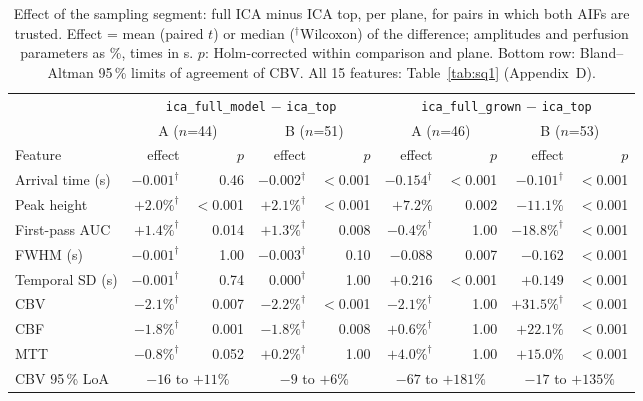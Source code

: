 \begin{table}[t]
\centering
\caption{Effect of the sampling segment: full ICA minus ICA top, per plane, for pairs in which both AIFs are
trusted. Effect = mean (paired $t$) or median ($^\dagger$Wilcoxon) of the difference; amplitudes and perfusion
parameters as \%, times in s. $p$: Holm-corrected within comparison and plane. Bottom row: Bland--Altman 95\,\%
limits of agreement of CBV. All 15 features: Table~\ref{tab:sq1} (Appendix~D).}
\label{tab:sq1_main}
\footnotesize
\begin{tabular}{l rr rr rr rr}
\hline
 & \multicolumn{4}{c}{\texttt{ica\_full\_model} $-$ \texttt{ica\_top}} & \multicolumn{4}{c}{\texttt{ica\_full\_grown} $-$ \texttt{ica\_top}} \\
 & \multicolumn{2}{c}{A ($n$=44)} & \multicolumn{2}{c}{B ($n$=51)} & \multicolumn{2}{c}{A ($n$=46)} & \multicolumn{2}{c}{B ($n$=53)} \\
Feature & effect & $p$ & effect & $p$ & effect & $p$ & effect & $p$ \\
\hline
Arrival time (s)   & $-0.001^\dagger$ & 0.46  & $-0.002^\dagger$ & $<$0.001 & $-0.154^\dagger$ & $<$0.001 & $-0.101^\dagger$ & $<$0.001 \\
Peak height        & $+2.0\%^\dagger$ & $<$0.001 & $+2.1\%^\dagger$ & $<$0.001 & $+7.2\%$  & 0.002 & $-11.1\%$ & $<$0.001 \\
First-pass AUC     & $+1.4\%^\dagger$ & 0.014 & $+1.3\%^\dagger$ & 0.008 & $-0.4\%^\dagger$ & 1.00 & $-18.8\%^\dagger$ & $<$0.001 \\
FWHM (s)           & $-0.001^\dagger$ & 1.00  & $-0.003^\dagger$ & 0.10  & $-0.088$ & 0.007 & $-0.162$ & $<$0.001 \\
Temporal SD (s)    & $-0.001^\dagger$ & 0.74  & $0.000^\dagger$  & 1.00  & $+0.216$ & $<$0.001 & $+0.149$ & $<$0.001 \\
CBV                & $-2.1\%^\dagger$ & 0.007 & $-2.2\%^\dagger$ & $<$0.001 & $-2.1\%^\dagger$ & 1.00 & $+31.5\%^\dagger$ & $<$0.001 \\
CBF                & $-1.8\%^\dagger$ & 0.001 & $-1.8\%^\dagger$ & 0.008 & $+0.6\%^\dagger$ & 1.00 & $+22.1\%$ & $<$0.001 \\
MTT                & $-0.8\%^\dagger$ & 0.052 & $+0.2\%^\dagger$ & 1.00  & $+4.0\%^\dagger$ & 1.00 & $+15.0\%$ & $<$0.001 \\
\hline
CBV 95\,\% LoA     & \multicolumn{2}{c}{$-16$ to $+11\%$} & \multicolumn{2}{c}{$-9$ to $+6\%$} & \multicolumn{2}{c}{$-67$ to $+181\%$} & \multicolumn{2}{c}{$-17$ to $+135\%$} \\
\hline
\end{tabular}
\end{table}

